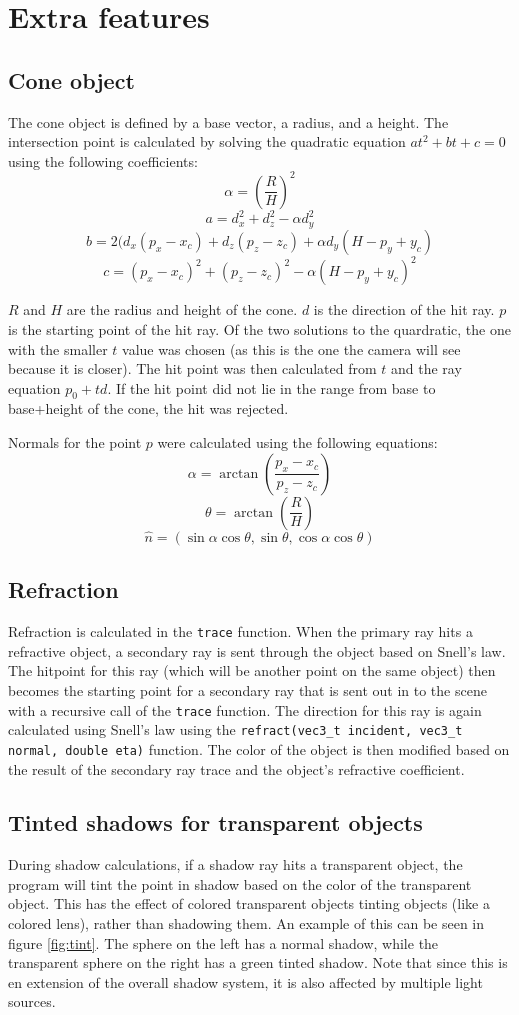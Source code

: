 \documentclass[11pt]{article}
\begin{document}
\section{Extra features}
\subsection{Cone object}
The cone object is defined by a base vector, a radius, and a height. The intersection point is calculated by solving the quadratic equation $at^2+bt+c = 0$ using the following coefficients:
$$\alpha = (\frac{R}{H})^2$$
$$a = d_x^2 + d_z^2 - \alpha d_y^2$$
$$b = 2(d_x(p_x - x_c) + d_z(p_z - z_c) + \alpha d_y(H - p_y + y_c)$$
$$c = (p_x - x_c)^2 + (p_z - z_c)^2 - \alpha (H - p_y + y_c)^2$$

$R$ and $H$ are the radius and height of the cone. $d$ is the direction of the hit ray. $p$ is the starting point of the hit ray. Of the two solutions to the quardratic, the one with the smaller $t$ value was chosen (as this is the one the camera will see because it is closer). The hit point was then calculated from $t$ and the ray equation $p_0 + td$. If the hit point did not lie in the range from base to base+height of the cone, the hit was rejected.

Normals for the point $p$ were calculated using the following equations:
$$\alpha = \arctan(\frac{p_x - x_c}{p_z - z_c})$$
$$\theta = \arctan(\frac{R}{H})$$
$$\hat{n} = (\sin\alpha\cos\theta, \sin\theta, \cos\alpha\cos\theta)$$

\subsection{Refraction}
Refraction is calculated in the \verb|trace| function. When the primary ray hits a refractive object, a secondary ray is sent through the object based on Snell's law. The hitpoint for this ray (which will be another point on the same object) then becomes the starting point for a secondary ray that is sent out in to the scene with a recursive call of the \verb|trace| function. The direction for this ray is again calculated using Snell's law using the \verb|refract(vec3_t incident, vec3_t normal, double eta)| function. The color of the object is then modified based on the result of the secondary ray trace and the object's refractive coefficient.

\subsection{Tinted shadows for transparent objects}
During shadow calculations, if a shadow ray hits a transparent object, the program will tint the point in shadow based on the color of the transparent object. This has the effect of colored transparent objects tinting objects (like a colored lens), rather than shadowing them. An example of this can be seen in figure \ref{fig:tint}. The sphere on the left has a normal shadow, while the transparent sphere on the right has a green tinted shadow. Note that since this is en extension of the overall shadow system, it is also affected by multiple light sources.
\end{document}
